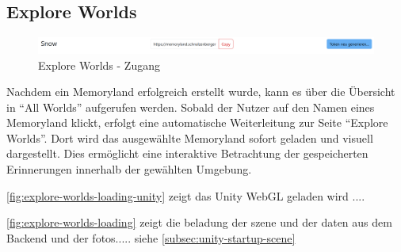 \subsection{Explore Worlds}


\begin{figure} [h t]
    \centering
    \includegraphics[scale=0.45]{pics/explore_worlds_header.PNG}
    \caption{Explore Worlds - Zugang}
    \label{fig:explore-worlds-overview}
\end{figure}

Nachdem ein Memoryland erfolgreich erstellt wurde, kann es über die Übersicht in ``All Worlds'' aufgerufen werden. 
Sobald der Nutzer auf den Namen eines Memoryland klickt, erfolgt eine automatische Weiterleitung 
zur Seite ``Explore Worlds''. Dort wird das ausgewählte Memoryland sofort geladen 
und visuell dargestellt. Dies ermöglicht eine interaktive Betrachtung der gespeicherten 
Erinnerungen innerhalb der gewählten Umgebung.

\ref{fig:explore-worlds-loading-unity} zeigt das Unity WebGL geladen wird ....


\ref{fig:explore-worlds-loading} zeigt die beladung der szene und der daten aus dem Backend und der fotos..... siehe \ref{subsec:unity-startup-scene}



